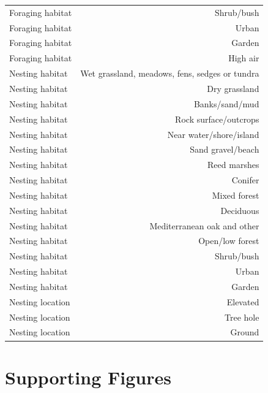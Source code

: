 \begin{longtable}[]{@{}lr@{}}
Foraging habitat & Shrub/bush\tabularnewline
Foraging habitat & Urban\tabularnewline
Foraging habitat & Garden\tabularnewline
Foraging habitat & High air\tabularnewline
Nesting habitat & Wet grassland, meadows, fens, sedges or
tundra\tabularnewline
Nesting habitat & Dry grassland\tabularnewline
Nesting habitat & Banks/sand/mud\tabularnewline
Nesting habitat & Rock surface/outcrops\tabularnewline
Nesting habitat & Near water/shore/island\tabularnewline
Nesting habitat & Sand gravel/beach\tabularnewline
Nesting habitat & Reed marshes\tabularnewline
Nesting habitat & Conifer\tabularnewline
Nesting habitat & Mixed forest\tabularnewline
Nesting habitat & Deciduous\tabularnewline
Nesting habitat & Mediterranean oak and other\tabularnewline
Nesting habitat & Open/low forest\tabularnewline
Nesting habitat & Shrub/bush\tabularnewline
Nesting habitat & Urban\tabularnewline
Nesting habitat & Garden\tabularnewline
Nesting location & Elevated\tabularnewline
Nesting location & Tree hole\tabularnewline
Nesting location & Ground\tabularnewline
\bottomrule
\end{longtable}

\newpage

\section{Supporting Figures}\label{supporting-figures}

